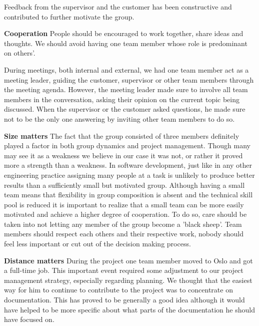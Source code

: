 Feedback from the supervisor and the customer has been constructive and
contributed to further motivate the group.

\textbf{Cooperation}\newline
People should be encouraged to work together, share ideas and thoughts.
We should avoid having one team member whose role is predominant on others'.

During meetings, both internal and external, we had one team member
act as a meeting leader, guiding the customer, supervisor or other team members through
the meeting agenda. However, the meeting leader made sure to involve all team members
in the conversation, asking their opinion on the current topic being discussed.
When the supervisor or the customer asked questions, he made sure not to be the only one
answering by inviting other team members to do so.

\textbf{Size matters}\newline
The fact that the group consisted of three members definitely played a factor in both group dynamics
and project management. Though many may see it as a weakness we believe in our case it was not,
or rather it proved more a strength than a weakness.
In software development, just like in any other engineering practice assigning many people
at a task is unlikely to produce better results than a sufficiently small but motivated group.
Although having a small team means that flexibility in group composition is absent and
the technical skill pool is reduced it is important to realize that a small team
can be more easily motivated and achieve a higher degree of cooperation.
To do so, care should be taken into not letting any member of the group become
a 'black sheep'. Team members should respect each others and their respective work,
nobody should feel less important or cut out of the decision making process.

\textbf{Distance matters}\newline
During the project one team member moved to Oslo and got a full-time job.
This important event required some adjustment to our project management strategy,
especially regarding planning. We thought that the easiest way for him to continue
to contribute to the project was to concentrate on documentation.
This has proved to be generally a good idea although it would have helped
to be more specific about what parts of the documentation he should have focused on.


